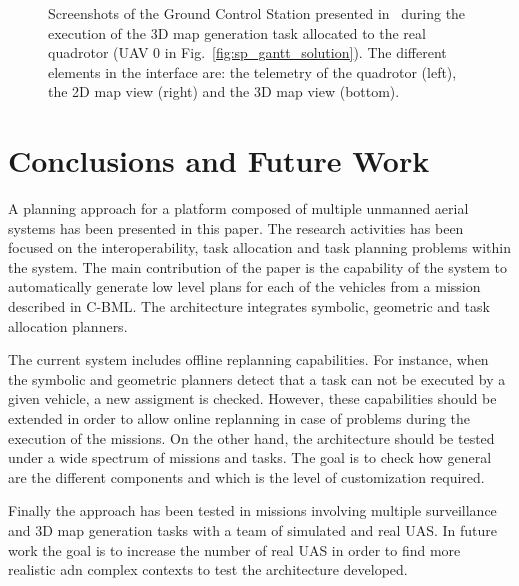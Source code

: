 \documentclass[twocolumn]{svjour3}          %
\begin{document}
\begin{figure}[htbp!]
{	\label{fig:exp:exp8_screen_3} } \caption[Screenshots of the Ground Control Station during the execution of the 3D map generation task allocated to the real quadrotor (UAV 0 in Fig.~\ref{fig:sp_gantt_solution}).]{Screenshots of the Ground Control Station presented in~\cite{perez_jint13} during the execution of the 3D map generation task allocated to the real quadrotor (UAV 0 in Fig.~\ref{fig:sp_gantt_solution}). The different elements in the interface are: the telemetry of the quadrotor (left), the 2D map view (right) and the 3D map view (bottom).}
    \label{fig:exp:exp8_screen}
\end{figure}

\section{Conclusions and Future Work}
	\label{sec:conclusions}

A planning approach for a platform composed of multiple unmanned aerial systems has been presented in this paper. The research activities has been focused on the interoperability, task allocation 
and task planning problems within the system. The main contribution of the paper is the capability of the system to automatically generate low level plans for each of the vehicles from a mission described in C-BML. The architecture integrates symbolic, geometric and task allocation planners.

The current system includes offline replanning capabilities. For instance, when the symbolic and geometric planners detect that a task can not be executed by a given vehicle, a new assigment is checked. However, these capabilities should be extended in order to allow online replanning in case of problems during the execution of the missions. On the other hand, the architecture should be tested under a wide spectrum of missions and tasks. The goal is to check how general are the different components and which is the level of customization required.

Finally the approach has been tested in missions involving multiple surveillance and 3D map generation tasks with a team of simulated and real UAS. In future work the goal is to increase the number of real UAS in order to find more realistic adn complex contexts to test the architecture developed. 




\end{document}
